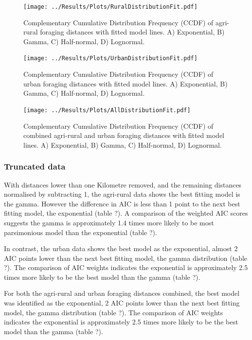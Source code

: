 \documentclass[11pt,usenames,dvipsnames]{article}
\begin{document}
\begin{figure}[H]
	\centering
	\texttt{[image: ../Results/Plots/RuralDistributionFit.pdf]}
	\caption{Complementary Cumulative Distribution Frequency (CCDF) of agri-rural foraging distances with fitted model lines. A) Exponential, B) Gamma, C) Half-normal, D) Lognormal.}
\end{figure}

\begin{figure}[H]
	\centering
	\texttt{[image: ../Results/Plots/UrbanDistributionFit.pdf]}
	\caption{Complementary Cumulative Distribution Frequency (CCDF) of urban foraging distances with fitted model lines. A) Exponential, B) Gamma, C) Half-normal, D) Lognormal.}
\end{figure}

\begin{figure}[H]
	\centering
	\texttt{[image: ../Results/Plots/AllDistributionFit.pdf]}
	\caption{Complementary Cumulative Distribution Frequency (CCDF) of combined agri-rural and urban foraging distances with fitted model lines. A) Exponential, B) Gamma, C) Half-normal, D) Lognormal.}
\end{figure}

\subsubsection{Truncated data}

\hspace{\parindent}
With distances lower than one Kilometre removed, and the remaining distances normalised by subtracting 1, the agri-rural data shows the best fitting model is the gamma. However the difference in AIC is less than 1 point to the next best fitting model, the exponential (table ?). A comparison of the weighted AIC scores suggests the gamma is approximately 1.4 times more likely to be most parsimonious model than the exponential (table ?).

In contrast, the urban data shows the best model as the exponential, almost 2 AIC points lower than the next best fitting model, the gamma distribution (table ?). The comparison of AIC weights indicates the exponential is approximately 2.5 times more likely to be the best model than the gamma (table ?).

For both the agri-rural and urban foraging distances combined, the best model was identified as the exponential, 2 AIC points lower than the next best fitting model, the gamma distribution (table ?). The comparison of AIC weights indicates the exponential is approximately 2.5 times more likely to be the best model than the gamma (table ?). 
\end{document}
